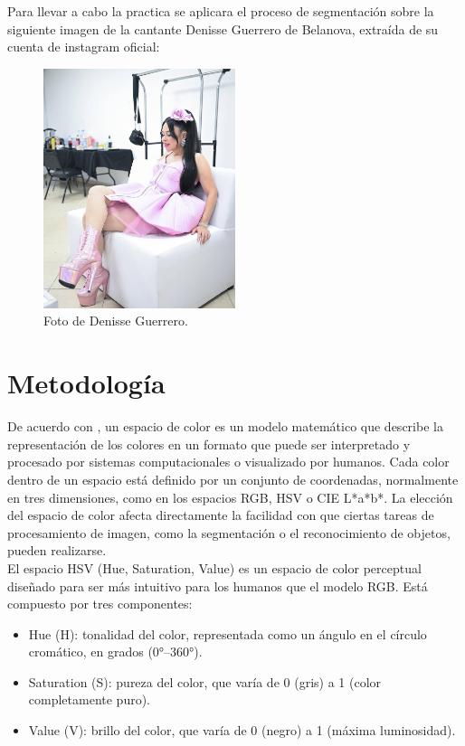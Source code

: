 \documentclass[11pt, letterpaper]{article}
\begin{document}
Para llevar a cabo la practica se aplicara el proceso de segmentación sobre la siguiente imagen de la cantante Denisse Guerrero de Belanova, extraída de su cuenta de instagram oficial:


\begin{figure}[h!]
	\centering
	\includegraphics[width=0.5\textwidth]{IMG/IM4.jpeg}
	\caption{Foto de Denisse Guerrero.}
	\label{fig:r0_r1}
\end{figure}

	
\newpage
	
\section{Metodología}

De acuerdo con \cite{gonzalez2018digital}, un espacio de color es un modelo matemático que describe la representación de los colores en un formato que puede ser interpretado y procesado por sistemas computacionales o visualizado por humanos. Cada color dentro de un espacio está definido por un conjunto de coordenadas, normalmente en tres dimensiones, como en los espacios RGB, HSV o CIE L*a*b*. La elección del espacio de color afecta directamente la facilidad con que ciertas tareas de procesamiento de imagen, como la segmentación o el reconocimiento de objetos, pueden realizarse. \\

El espacio HSV (Hue, Saturation, Value) es un espacio de color perceptual diseñado para ser más intuitivo para los humanos que el modelo RGB. Está compuesto por tres componentes:


\begin{itemize}
	
	\item Hue (H): tonalidad del color, representada como un ángulo en el círculo cromático, en grados (0°–360°).
	
	\item Saturation (S): pureza del color, que varía de 0 (gris) a 1 (color completamente puro).
	
	\item Value (V): brillo del color, que varía de 0 (negro) a 1 (máxima luminosidad).
	
	
\end{itemize}
\end{document}

